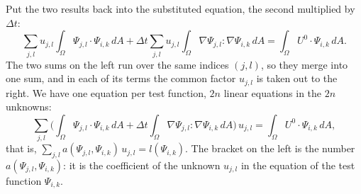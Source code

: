 Put the two results back into the substituted equation, the second multiplied by $\Delta t$:
\begin{equation*}
\sum_{j,l} u_{j,l} \int_\Omega \Psi_{j,l} \cdot \Psi_{i,k}\, dA + \Delta t \sum_{j,l} u_{j,l}\int_\Omega \nabla \Psi_{j,l} : \nabla \Psi_{i,k}\, dA = \int_\Omega U^0 \cdot \Psi_{i,k}\, dA .
\end{equation*}
The two sums on the left run over the same indices $(j, l)$, so they merge into one sum, and in each of its terms the common factor $u_{j,l}$ is taken out to the right. We have one equation per test function, $2n$ linear equations in the $2n$ unknowns:
\begin{equation}
\label{eqn:galerkin}
\sum_{j,l} \Big( \int_\Omega \Psi_{j,l} \cdot \Psi_{i,k}\, dA + \Delta t \int_\Omega \nabla \Psi_{j,l} : \nabla \Psi_{i,k}\, dA \Big)\, u_{j,l} = \int_\Omega U^0 \cdot \Psi_{i,k}\, dA ,
\end{equation}
that is, $\sum_{j,l} a(\Psi_{j,l}, \Psi_{i,k})\, u_{j,l} = l(\Psi_{i,k})$. The bracket on the left is the number $a(\Psi_{j,l}, \Psi_{i,k})$: it is the coefficient of the unknown $u_{j,l}$ in the equation of the test function $\Psi_{i,k}$.

